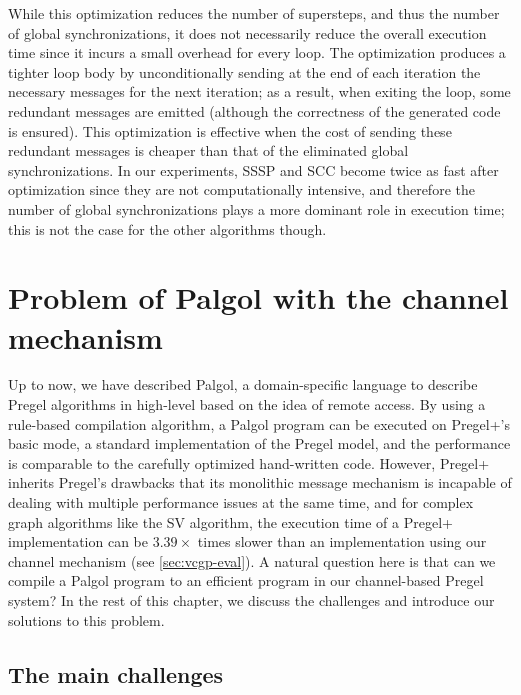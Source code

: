 \documentclass{sokendai_thesis} %
\newcommand{\PP}{Pregel+}
\begin{document}
While this optimization reduces the number of supersteps, and thus the number of global synchronizations, it does not necessarily reduce the overall execution time since it incurs a small overhead for every loop.
The optimization produces a tighter loop body by unconditionally sending at the end of each iteration the necessary messages for the next iteration; as a result, when exiting the loop, some redundant messages are emitted (although the correctness of the generated code is ensured).
This optimization is effective when the cost of sending these redundant messages is cheaper than that of the eliminated global synchronizations.
In our experiments, SSSP and SCC become twice as fast after optimization since they are not computationally intensive, and therefore the number of global synchronizations plays a more dominant role in execution time; this is not the case for the other algorithms though.

\section{Problem of Palgol with the channel mechanism}

Up to now, we have described Palgol, a domain-specific language to describe Pregel algorithms in high-level based on the idea of remote access.
By using a rule-based compilation algorithm, a Palgol program can be executed on \PP{}'s basic mode, a standard implementation of the Pregel model, and the performance is comparable to the carefully optimized hand-written code.
However, \PP{} inherits Pregel's drawbacks that its monolithic message mechanism is incapable of dealing with multiple performance issues at the same time, and for complex graph algorithms like the SV algorithm, the execution time of a \PP{} implementation can be $3.39\times$ times slower than an implementation using our channel mechanism (see \autoref{sec:vcgp-eval}).
A natural question here is that can we compile a Palgol program to an efficient program in our channel-based Pregel system?
In the rest of this chapter, we discuss the challenges and introduce our solutions to this problem.

\subsection{The main challenges}
\end{document}
